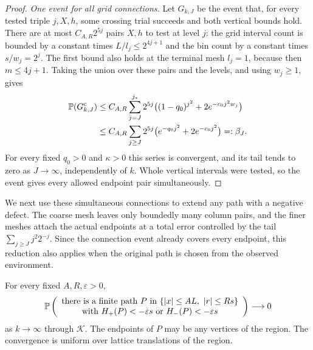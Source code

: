 \begin{proof}
\emph{One event for all grid connections.}
Let $G_{k,J}$ be the event that, for every tested triple $j,X,h$,
some crossing trial succeeds and both vertical bounds hold.
There are at most $C_{A,R}2^{5j}$ pairs $X,h$ to test at level $j$:
the grid interval count is bounded by a constant times
$L/l_j\le2^{4j+1}$ and the bin count by a constant times
$s/w_j=2^j$. The first bound also holds at the terminal mesh
$l_j=1$, because then $m\le4j+1$.
Taking the union over these pairs and the levels, and
using $w_j\ge1$, gives
\[
 \begin{split}
 \mathbb P(G_{k,J}^{\mathrm c})
 &\le C_{A,R}\sum_{j=J}^{j_*}2^{5j}
       \bigl((1-q_0)^{j^2}+2e^{-c_0j^2w_j}\bigr)\\
 &\le C_{A,R}\sum_{j\ge J}2^{5j}
       \bigl(e^{-q_0j^2}+2e^{-c_0j^2}\bigr)=:\beta_J.
 \end{split}
\]
For every fixed $q_0>0$ and $\kappa>0$ this series is convergent,
and its tail tends to zero as $J\to\infty$, independently of $k$.
Whole vertical intervals were tested, so the event gives every
allowed endpoint pair simultaneously.
\end{proof}

We next use these simultaneous connections to extend any path with a
negative defect. The coarse mesh leaves only boundedly many column
pairs, and the finer meshes attach the actual endpoints at a total
error controlled by the tail $\sum_{j\ge J}j^2 2^{-j}$. Since the
connection event already covers every endpoint, this reduction also
applies when the original path is chosen from the observed environment.

\begin{lemma}\label{df:gr:variable-endpoints}
For every fixed $A,R,\varepsilon>0$,
\begin{equation}\label{df:eq:gr-variable-endpoints}
 \mathbb P\left(
 \begin{array}{c}
 \text{there is a finite path }P\text{ in }
 \{\left\lvert x\right\rvert\leq AL,\ \left\lvert r\right\rvert\leq Rs\}\\
 \text{with }H_+(P)<-\varepsilon s\text{ or }H_-(P)<-\varepsilon s
 \end{array}\right)\longrightarrow0
\end{equation}
as $k\to\infty$ through $\mathcal K$. The endpoints of $P$ may be any
vertices of the region. The convergence is uniform over lattice
translations of the region.
\end{lemma}

